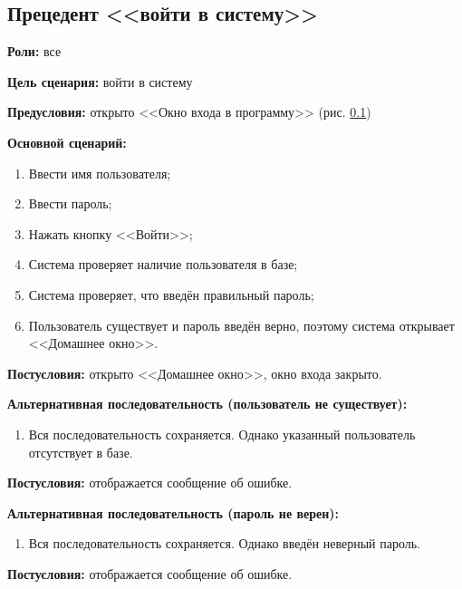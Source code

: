 \subsection{Прецедент <<войти в систему>>}
\textbf{Роли:} все \par
\textbf{Цель сценария:} войти в систему \par
\textbf{Предусловия:} открыто <<Окно входа в программу>> (рис. \ref{}) \par
\textbf{Основной сценарий:} 
\begin{enumerate}
    \item Ввести имя пользователя;
    \item Ввести пароль;
    \item Нажать кнопку <<Войти>>;
    \item Система проверяет наличие пользователя в базе;
    \item Система проверяет, что введён правильный пароль;
    \item Пользователь существует и пароль введён верно, 
        поэтому система открывает <<Домашнее окно>>.
\end{enumerate} \par
\textbf{Постусловия:} открыто <<Домашнее окно>>, окно входа закрыто. \par
\textbf{Альтернативная последовательность (пользователь не существует):} \par
\begin{enumerate}
    \item Вся последовательность сохраняется. Однако указанный пользователь 
        отсутствует в базе.
\end{enumerate} \par
\textbf{Постусловия:} отображается сообщение об ошибке. \par
\textbf{Альтернативная последовательность (пароль не верен):} \par
\begin{enumerate}
    \item Вся последовательность сохраняется. Однако введён неверный пароль.
\end{enumerate} \par
\textbf{Постусловия:} отображается сообщение об ошибке. \par

